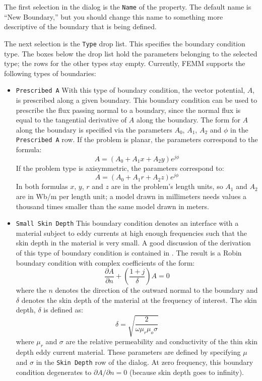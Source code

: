 \documentclass[12pt]{report}
\newcommand{\be}{\begin{equation}}
\newcommand{\ee}{\end{equation}}
\begin{document}
The first selection in the dialog is the {\tt Name} of the
property.  The default name is ``New Boundary,'' but you should
change this name to something more descriptive of the boundary that
is being defined.

The next selection is the {\tt Type} drop list.  This specifies
the boundary condition type.  The boxes below the drop list hold the
parameters belonging to the selected type; the rows for the other types
stay empty.  Currently, FEMM supports the
following types of boundaries:
\begin{itemize}
\item {\tt Prescribed A}
With this type of boundary condition, the vector potential, $A$, is
prescribed along a given boundary.  This boundary condition can be
used to prescribe the flux passing normal to a boundary, since the
normal flux is equal to the tangential derivative of $A$ along the
boundary.  The form for $A$ along the boundary is specified via the
parameters $A_0$, $A_1$, $A_2$ and $\phi$ in the
{\tt Prescribed A} row.  If the problem is planar, the
parameters correspond to the formula:
\be A=(A_0 + A_1 x + A_2 y) e^{j \phi} \ee
If the problem type is axisymmetric, the parameters correspond to:
\be A=(A_0 + A_1 r + A_2 z) e^{j \phi} \ee
In both formulas $x$, $y$, $r$ and $z$ are in the problem's length
units, so $A_1$ and $A_2$ are in Wb/m per length unit; a model drawn
in millimeters needs values a thousand times smaller than the same
model drawn in meters.
\item {\tt Small Skin Depth}
This boundary condition denotes an interface with a material
subject to eddy currents at high enough frequencies such that the
skin depth in the material is very small.  A good discussion of the
derivation of this type of boundary condition is contained in
\cite{Hoole}.  The result is a Robin boundary condition with
complex coefficients of the form:
\be \frac{\partial A}{\partial n} + \left( \frac{1+j}{\delta} \right) A = 0 \ee
where the $n$ denotes the direction of the outward normal to the
boundary and $\delta$ denotes the skin depth of the material at the
frequency of interest.  The skin depth, $\delta$ is defined as:
\be \delta = \sqrt{\frac{2}{\omega \mu_r \mu_o \sigma}} \ee
where $\mu_r$ and $\sigma$ are the relative permeability and
conductivity of the thin skin depth eddy current material.  These
parameters are defined by specifying $\mu$ and $\sigma$ in
the {\tt Skin Depth} row of the dialog.  At zero
frequency, this boundary condition degenerates to $\partial
A/\partial n=0$ (because skin depth goes to infinity).

\end{itemize}
\end{document}
